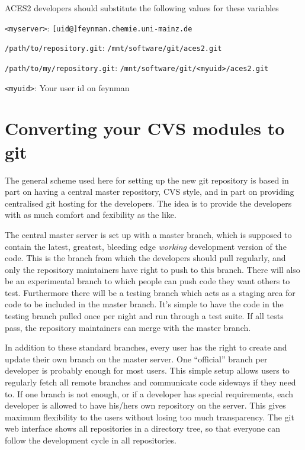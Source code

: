 \documentclass[a4paper,10pt]{article}
\begin{document}
ACES2 developers should substitute the following values for these variables
\begin{description}
  \item{\tt <myserver>}: {\tt [uid@]feynman.chemie.uni-mainz.de}
  \item{\tt /path/to/repository.git}: {\tt /mnt/software/git/aces2.git}
  \item{\tt /path/to/my/repository.git}: 
	{\tt /mnt/software/git/<myuid>/aces2.git}
  \item{\tt <myuid>}: Your user id on feynman
\end{description}

\section{Converting your CVS modules to git}
The general scheme used here for setting up the new git repository is based
in part on having a central master repository, CVS style, and in
part on providing centralised git hosting for the developers. The idea is to
provide the developers with as much comfort and fexibility as the like. 

The central master server is set up with a master branch, which is supposed to
contain the latest, greatest, bleeding edge {\em working} development version
of the code. This is the branch from which the developers should pull
regularly, and only the repository maintainers have right to push to this
branch. There will also be an experimental branch to which people
can push code they want others to test. Furthermore there will be a testing
branch which acts as a staging area for code to be included in the master
branch. It's simple to have the code in the testing branch 
pulled once per night and run through a test suite. If all tests pass,
the repository maintainers can merge with the master branch. 

In addition to these standard branches, every user has the right to create and
update their own branch on the master server. One ``official'' branch per
developer is probably enough for most users. This simple setup allows users to
regularly fetch all remote branches and communicate code sideways if they need
to. If one branch is not enough, or if a developer has special requirements,
each developer is allowed to have his/hers own repository on the server. This
gives maximum flexibility to the users without losing too much transparency.
The git web interface shows all repositories in a directory tree, so that
everyone can follow the development cycle in all repositories.
\end{document}
